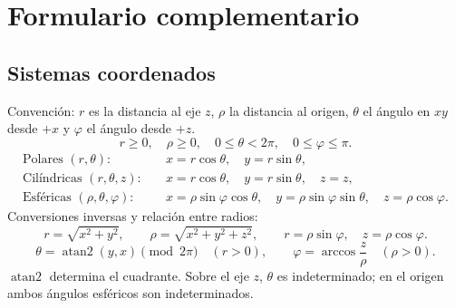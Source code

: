 ﻿\section{Formulario complementario}
\begingroup
\footnotesize
\setlength{\parindent}{0pt}
\setlength{\abovedisplayskip}{3pt}
\setlength{\belowdisplayskip}{3pt}
\setlength{\abovedisplayshortskip}{3pt}
\setlength{\belowdisplayshortskip}{3pt}

\subsection*{Sistemas coordenados}
Convención: $r$ es la distancia al eje $z$, $\rho$ la distancia al origen,
$\theta$ el ángulo en $xy$ desde $+x$ y $\varphi$ el ángulo desde $+z$.
\[
r\geq0,\quad \rho\geq0,\quad 0\leq\theta<2\pi,\quad 0\leq\varphi\leq\pi.
\]
\begin{align*}
\text{Polares }(r,\theta):&\quad x=r\cos\theta,\quad y=r\sin\theta,\\
\text{Cilíndricas }(r,\theta,z):&\quad x=r\cos\theta,\quad y=r\sin\theta,\quad z=z,\\
\text{Esféricas }(\rho,\theta,\varphi):&\quad
x=\rho\sin\varphi\cos\theta,\quad y=\rho\sin\varphi\sin\theta,\quad z=\rho\cos\varphi.
\end{align*}
Conversiones inversas y relación entre radios:
\[
r=\sqrt{x^2+y^2},\qquad \rho=\sqrt{x^2+y^2+z^2},\qquad
r=\rho\sin\varphi,\quad z=\rho\cos\varphi.
\]
\[
\theta=\operatorname{atan2}(y,x)\pmod{2\pi}\quad(r>0),\qquad
\varphi=\arccos\frac{z}{\rho}\quad(\rho>0).
\]
$\operatorname{atan2}$ determina el cuadrante. Sobre el eje $z$, $\theta$ es
indeterminado; en el origen ambos ángulos esféricos son indeterminados.

